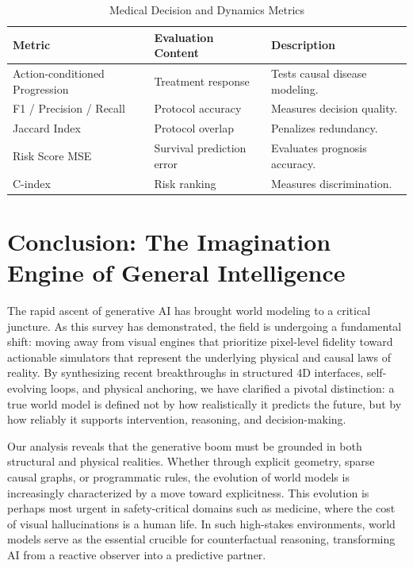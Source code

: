 \documentclass[pdflatex,sn-mathphys-num]{sn-jnl}
\theoremstyle{thmstyleone}%
\theoremstyle{thmstyletwo}%
\theoremstyle{thmstylethree}%
\begin{document}
\begin{table}[t!]
\centering
\caption{Medical Decision and Dynamics Metrics}
\label{6}
\begin{tabular}{l|l|l}
\hline
\textbf{Metric} & \textbf{Evaluation Content} & \textbf{Description} \\
\hline
Action-conditioned Progression & Treatment response & Tests causal disease modeling. \\
F1 / Precision / Recall & Protocol accuracy & Measures decision quality. \\
Jaccard Index & Protocol overlap & Penalizes redundancy. \\
Risk Score MSE & Survival prediction error & Evaluates prognosis accuracy. \\
C-index & Risk ranking & Measures discrimination. \\
\hline
\end{tabular}
\end{table}

\section{Conclusion: The Imagination Engine of General Intelligence}

The rapid ascent of generative AI has brought world modeling to a critical juncture. As this survey has demonstrated, the field is undergoing a fundamental shift: moving away from visual engines that prioritize pixel-level fidelity toward actionable simulators that represent the underlying physical and causal laws of reality. By synthesizing recent breakthroughs in structured 4D interfaces, self-evolving loops, and physical anchoring, we have clarified a pivotal distinction: a true world model is defined not by how realistically it predicts the future, but by how reliably it supports intervention, reasoning, and decision-making.

Our analysis reveals that the generative boom must be grounded in both structural and physical realities. Whether through explicit geometry, sparse causal graphs, or programmatic rules, the evolution of world models is increasingly characterized by a move toward explicitness. This evolution is perhaps most urgent in safety-critical domains such as medicine, where the cost of visual hallucinations is a human life. In such high-stakes environments, world models serve as the essential crucible for counterfactual reasoning, transforming AI from a reactive observer into a predictive partner.
\end{document}
